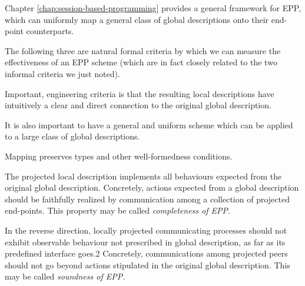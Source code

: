 Chapter \ref{chap:session-based-programming} provides a general framework for EPP, which can uniformly map a general class of global descriptions onto their end-point counterparts. 

The following three are natural formal criteria by which we can measure the effectiveness of an EPP scheme (which are in fact closely related to the two informal criteria we just noted). 

\begin{compactenum}
\item  Important, engineering criteria is that the resulting local descriptions have intuitively a clear and direct connection to the original global description. 

\item  It is also important to have a general and uniform scheme which can be applied to a large class of global descriptions.

\item  Mapping preserves types and other well-formedness conditions.

\item  The projected local description implements all behaviours expected from the original global description. Concretely, actions expected from a global description should be faithfully realized by communication among a collection of projected end-points. This property may be called \textit{completeness of EPP}.

\item  In the reverse direction, locally projected communicating processes should not exhibit observable behaviour not prescribed in global description, as far as its predefined interface goes.2 Concretely, communications among projected peers should not go beyond actions stipulated in the original global description. This may be called \textit{soundness of EPP.}
\end{compactenum}